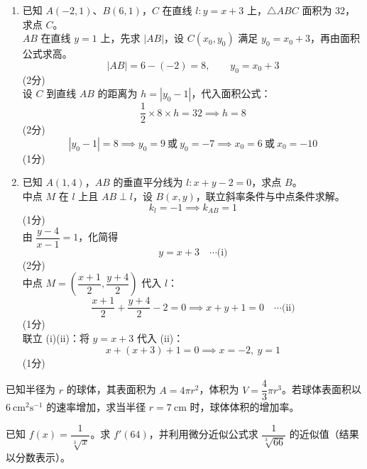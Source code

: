 \documentclass[12pt,a4paper]{exam-zh}
\newcommand{\qscore}[1]{%
    \unskip\nobreak\hfill
    \makebox[0pt][l]{\makebox[4em][r]{(#1\%)}}%
}
\begin{document}
\begin{solution}
    \begin{enumerate}[label=(\alph*)]
        \item 已知 $A(-2,1)$、$B(6,1)$，$C$ 在直线 $l:y=x+3$ 上，$\triangle ABC$ 面积为 $32$，求点 $C$。 \\
        $AB$ 在直线 $y=1$ 上，先求 $|AB|$，设 $C(x_0,y_0)$ 满足 $y_0=x_0+3$，再由面积公式求高。
        \[
            \displaystyle |AB| = 6-(-2) = 8,\qquad y_0 = x_0+3
        \] \hfill (2分) \\
        设 $C$ 到直线 $AB$ 的距离为 $h=|y_0-1|$，代入面积公式：
        \[
            \displaystyle \frac{1}{2}\times 8\times h = 32 \implies h = 8
        \] \hfill (2分) \\
        \[
            \displaystyle |y_0-1|=8 \implies y_0=9\ \text{或}\ y_0=-7 \implies x_0=6\ \text{或}\ x_0=-10
        \] \hfill (1分)

        \item 已知 $A(1,4)$，$AB$ 的垂直平分线为 $l:x+y-2=0$，求点 $B$。 \\
        中点 $M$ 在 $l$ 上且 $AB\perp l$，设 $B(x,y)$，联立斜率条件与中点条件求解。
        \[
            \displaystyle k_l=-1 \implies k_{AB}=1
        \] \hfill (1分) \\
        由 $\dfrac{y-4}{x-1}=1$，化简得
        \[
            \displaystyle y=x+3 \quad \cdots\text{(i)}
        \] \hfill (2分) \\
        中点 $M=\left(\dfrac{x+1}{2},\dfrac{y+4}{2}\right)$ 代入 $l$：
        \[
            \displaystyle \frac{x+1}{2}+\frac{y+4}{2}-2=0 \implies x+y+1=0 \quad \cdots\text{(ii)}
        \] \hfill (1分) \\
        联立 (i)(ii)：将 $y=x+3$ 代入 (ii)：
        \[
            \displaystyle x+(x+3)+1=0 \implies x=-2,\ y=1
        \] \hfill (1分)
    \end{enumerate}
\end{solution}



\begin{question}[points = 10]
    \begin{questionparts}
        \item 已知半径为 $r$ 的球体，其表面积为 $A = 4\pi r^2$，体积为 $V = \dfrac{4}{3}\pi r^3$。若球体表面积以 $6\ \text{cm}^2\text{s}^{-1}$ 的速率增加，求当半径 $r = 7\ \text{cm}$ 时，球体体积的增加率。 \qscore{4}

        \item 已知 $f(x) = \dfrac{1}{\sqrt[3]{x}}$。求 $f'(64)$，并利用微分近似公式求 $\dfrac{1}{\sqrt[3]{66}}$ 的近似值（结果以分数表示）。 \qscore{5}
    \end{questionparts}
\end{question}
\end{document}
